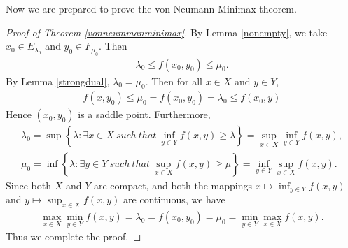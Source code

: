 \documentclass{article}
\numberwithin{equation}{section}
\begin{document}
Now we are prepared to prove the von Neumann Minimax theorem.

\begin{proof}[Proof of Theorem \ref{vonneummanminimax}]
By Lemma \ref{nonempty}, we take $x_0\in E_{\lambda_0}$ and $y_0\in F_{\mu_0}$. Then
\begin{align*}
	\lambda_0\leq f(x_0,y_0)\leq\mu_0.
\end{align*}
By Lemma \ref{strongdual}, $\lambda_0=\mu_0$. Then for all $x\in X$ and $y\in Y$,
\begin{align*}
	f(x,y_0)\leq \mu_0= f(x_0,y_0)=\lambda_0\leq f(x_0,y)
\end{align*}
Hence $(x_0,y_0)$ is a saddle point. Furthermore,
\begin{align*}
	\lambda_0=\sup\left\{\lambda:\exists x\in X\ such\ that\ \inf_{y\in Y}f(x,y)\geq\lambda\right\}=\sup_{x\in X}\inf_{y\in Y} f(x,y),\\
	\mu_0=\inf\left\{\lambda:\exists y\in Y\ such\ that\ \sup_{x\in X}f(x,y)\geq\mu\right\}=\inf_{y\in Y}\sup_{x\in X}f(x,y).
\end{align*}
Since both $X$ and $Y$ are compact, and both the mappings $x\mapsto\inf_{y\in Y}f(x,y)$ and $y\mapsto\sup_{x\in X}f(x,y)$ are continuous, we have
\begin{align*}
	\max_{x\in X}\min_{y\in Y} f(x,y)=\lambda_0=f(x_0,y_0)=\mu_0=\min_{y\in Y}\max_{x\in X} f(x,y).
\end{align*}
Thus we complete the proof.
\end{proof}
\end{document}
